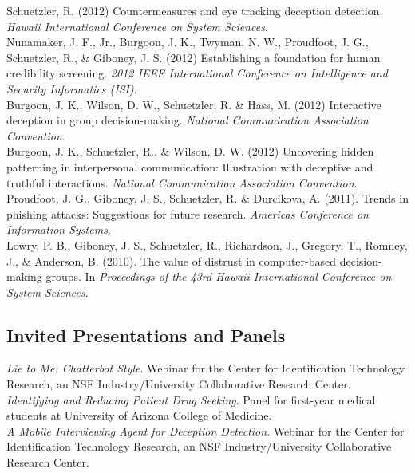 \documentclass[10pt, letter]{article}
\newcommand{\years}[1]{\marginnote{\scriptsize #1}}
\begin{document}
\years{2012}Schuetzler, R. (2012) Countermeasures and eye tracking deception
detection. \emph{Hawaii International Conference on System Sciences}.\\

Nunamaker, J. F., Jr., Burgoon, J. K., Twyman, N. W., Proudfoot, J. G.,
Schuetzler, R., \& Giboney, J. S. (2012) Establishing a foundation for human
credibility screening. \emph{2012 IEEE International Conference on Intelligence
  and Security Informatics (ISI)}.\\

Burgoon, J. K., Wilson, D. W., Schuetzler, R. \& Hass, M. (2012) Interactive
deception in group decision-making. \emph{National Communication Association
  Convention}.\\
\newpage
Burgoon, J. K., Schuetzler, R., \& Wilson, D. W. (2012) Uncovering hidden
patterning in interpersonal communication: Illustration with deceptive and
truthful interactions. \emph{National Communication Association Convention}.\\

\years{2011}Proudfoot, J. G., Giboney, J. S., Schuetzler, R. \& Durcikova,
A. (2011). Trends in phishing attacks: Suggestions for future
research. \emph{Americas Conference on Information Systems}.\\

\years{2010}Lowry, P. B., Giboney, J. S., Schuetzler, R., Richardson, J.,
Gregory, T., Romney, J., \& Anderson, B. (2010). The value of distrust in
computer-based decision-making groups. In \emph{Proceedings of the 43rd Hawaii
  International Conference on System Sciences}.

\subsection*{Invited Presentations and Panels}
\noindent

\years{2015}\emph{Lie to Me: Chatterbot Style}. Webinar for the Center for Identification
Technology Research, an NSF Industry/University Collaborative Research Center.\\

\years{2014}\emph{Identifying and Reducing Patient Drug Seeking}. Panel for first-year
medical students at University of Arizona College of Medicine.\\

\emph{A Mobile Interviewing Agent for Deception Detection}. Webinar for the
Center for Identification Technology Research, an NSF Industry/University Collaborative
Research Center.\\
\end{document}
